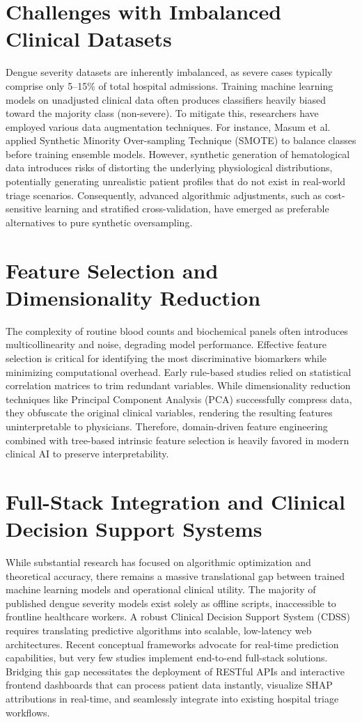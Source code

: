 \documentclass[12pt, a4paper]{report}
\begin{document}
\section{Challenges with Imbalanced Clinical Datasets}
Dengue severity datasets are inherently imbalanced, as severe cases typically comprise only 5--15\% of total hospital admissions. Training machine learning models on unadjusted clinical data often produces classifiers heavily biased toward the majority class (non-severe). To mitigate this, researchers have employed various data augmentation techniques. For instance, Masum et al. \cite{masum2025} applied Synthetic Minority Over-sampling Technique (SMOTE) to balance classes before training ensemble models. However, synthetic generation of hematological data introduces risks of distorting the underlying physiological distributions, potentially generating unrealistic patient profiles that do not exist in real-world triage scenarios. Consequently, advanced algorithmic adjustments, such as cost-sensitive learning \cite{potts2010} and stratified cross-validation, have emerged as preferable alternatives to pure synthetic oversampling.

\section{Feature Selection and Dimensionality Reduction}
The complexity of routine blood counts and biochemical panels often introduces multicollinearity and noise, degrading model performance. Effective feature selection is critical for identifying the most discriminative biomarkers while minimizing computational overhead. Early rule-based studies \cite{tanner2008} relied on statistical correlation matrices to trim redundant variables. While dimensionality reduction techniques like Principal Component Analysis (PCA) successfully compress data, they obfuscate the original clinical variables, rendering the resulting features uninterpretable to physicians. Therefore, domain-driven feature engineering combined with tree-based intrinsic feature selection is heavily favored in modern clinical AI to preserve interpretability.

\section{Full-Stack Integration and Clinical Decision Support Systems}
While substantial research has focused on algorithmic optimization and theoretical accuracy, there remains a massive translational gap between trained machine learning models and operational clinical utility. The majority of published dengue severity models exist solely as offline scripts, inaccessible to frontline healthcare workers. A robust Clinical Decision Support System (CDSS) requires translating predictive algorithms into scalable, low-latency web architectures. Recent conceptual frameworks \cite{haque2025} advocate for real-time prediction capabilities, but very few studies implement end-to-end full-stack solutions. Bridging this gap necessitates the deployment of RESTful APIs and interactive frontend dashboards that can process patient data instantly, visualize SHAP attributions in real-time, and seamlessly integrate into existing hospital triage workflows.
\end{document}
